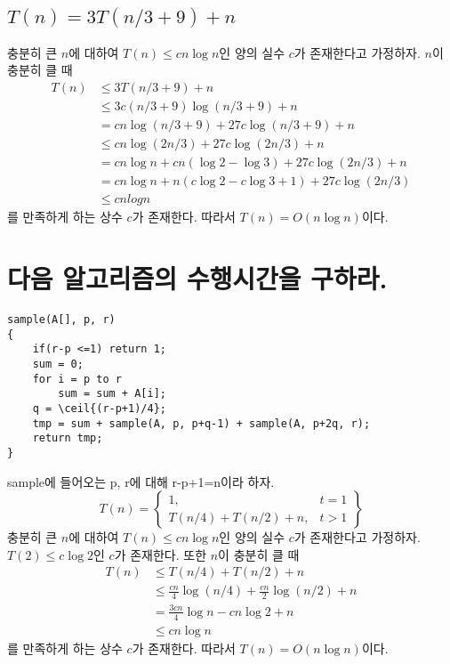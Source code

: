 \documentclass{article}
\begin{document}
\subsection{$T(n) = 3T(n/3 + 9)+ n$}
충분히 큰 $n$에 대하여 $T(n) \le cn\log n$인 양의 실수 $c$가 존재한다고 가정하자. $n$이 충분히 클 때
\begin{align*}
    T(n) &\le 3T(n/3 + 9) + n \\
         &\le 3c(n/3+9)\log(n/3+9)+ n \\
         &= cn\log(n/3+9) + 27c\log(n/3+9) + n \\ 
         &\le cn\log(2n/3) + 27c\log(2n/3) + n \\
         &= cn\log n + cn(\log2 - \log 3) + 27c\log(2n/3) + n\\
         &= cn \log n + n(c\log 2 - c\log 3 + 1) + 27c \log (2n/3) \\
         & \le cn log n
\end{align*}
를 만족하게 하는 상수 $c$가 존재한다. 따라서 $T(n) = O(n\log n)$이다.


\section{다음 알고리즘의 수행시간을 구하라.}
\begin{lstlisting}
sample(A[], p, r)
{
    if(r-p <=1) return 1;
    sum = 0;
    for i = p to r
        sum = sum + A[i];
    q = \ceil{(r-p+1)/4};
    tmp = sum + sample(A, p, p+q-1) + sample(A, p+2q, r);
    return tmp; 
}
\end{lstlisting}
sample에 들어오는 p, r에 대해 r-p+1=n이라 하자.
$$
T(n) = \left\{\begin{array}{lr}
    1, &  t = 1\\
    T(n/4)+ T(n/2)+n, &  t > 1
    \end{array}\right\}
$$
충분히 큰 $n$에 대하여 $T(n) \le cn\log n$인 양의 실수 $c$가 존재한다고 가정하자. $T(2) \le c\log 2$인 $c$가 존재한다. 또한 $n$이 충분히 클 때
\begin{align*}
    T(n) &\le T(n/4) + T(n/2) + n \\
         &\le \frac{cn}{4}\log(n/4) + \frac{cn}{2}\log(n/2) + n \\
         &= \frac{3cn}{4}\log n - cn \log 2 + n \\ 
         &\le cn \log n 
\end{align*}
를 만족하게 하는 상수 $c$가 존재한다. 따라서 $T(n) = O(n\log n)$이다.
\end{document}
